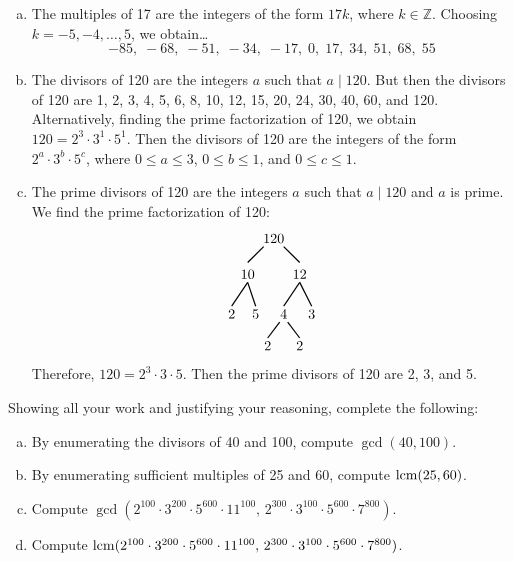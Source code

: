 \documentclass[11pt,letterpaper]{article}
\begin{document}
\sol 
\begin{enumerate}[(a)]
\item The multiples of 17 are the integers of the form $17k$, where $k \in \mathbb{Z}$. Choosing $k= -5, -4, \ldots, 5$, we obtain\dots
	\[
	-85, \; -68, \; -51, \; -34, \; -17, \; 0, \; 17, \; 34, \; 51, \; 68, \; 55
	\] \pspace

\item The divisors of 120 are the integers $a$ such that $a \mid 120$. But then the divisors of 120 are 1, 2, 3, 4, 5, 6, 8, 10, 12, 15, 20, 24, 30, 40, 60, and 120. Alternatively, finding the prime factorization of 120, we obtain $120= 2^3 \cdot 3^1 \cdot 5^1$. Then the divisors of 120 are the integers of the form $2^a \cdot 3^b \cdot 5^c$, where $0 \leq a \leq 3$, $0 \leq b \leq 1$, and $0 \leq c \leq 1$. \pspace

\item The prime divisors of 120 are the integers $a$ such that $a \mid 120$ and $a$ is prime. We find the prime factorization of 120: 
	\[
	\begin{tikzpicture}
	\node at (-0.15,0.1) {$120$};
	\draw[line width=0.03cm] (-0.4,-0.1) -- (-0.8,-0.5);
	\node at (-0.8,-0.8) {$10$};
	\draw[line width=0.03cm]  (0.1,-0.1) -- (0.5,-0.5);
	\node at (0.5,-0.8) {$12$};
		
	\draw[line width=0.03cm] (-0.8,-1) -- (-1.2,-1.6);
	\node at (-1.2,-1.8) {$2$};
	\draw[line width=0.03cm] (-0.8,-1) -- (-0.6,-1.6);
	\node at (-0.6,-1.8) {$5$};
	
	\draw[line width=0.03cm] (0.5,-1) -- (0.1,-1.6);
	\node at (0.1,-1.8) {$4$};
	\draw[line width=0.03cm] (0.5,-1) -- (0.8,-1.6);
	\node at (0.8,-1.8) {$3$};
	
	\draw[line width=0.03cm] (0,-2.0) -- (-0.3,-2.4);
	\node at (-0.3,-2.6) {$2$};
	\draw[line width=0.03cm] (0.2,-2.0) -- (0.5,-2.4);
	\node at (0.5,-2.6) {$2$};
	\end{tikzpicture}
	\] 
Therefore, $120= 2^3 \cdot 3 \cdot 5$. Then the prime divisors of 120 are 2, 3, and 5. 
\end{enumerate}



\newpage



 Showing all your work and justifying your reasoning, complete the following:
	\begin{enumerate}[(a)]
	\item By enumerating the divisors of 40 and 100, compute $\gcd(40, 100)$.
	\item By enumerating sufficient multiples of 25 and 60, compute $\operatorname{lcm}(25, 60)$.
	\item Compute $\gcd(2^{100} \cdot 3^{200} \cdot 5^{600} \cdot 11^{100},\, 2^{300} \cdot 3^{100} \cdot 5^{600} \cdot 7^{800})$. 
	\item Compute $\operatorname{lcm}(2^{100} \cdot 3^{200} \cdot 5^{600} \cdot 11^{100},\, 2^{300} \cdot 3^{100} \cdot 5^{600} \cdot 7^{800})$. 
	\end{enumerate} \pspace
\end{document}
